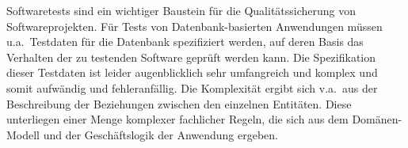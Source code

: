 
%
%
%
%



Softwaretests sind ein wichtiger Baustein für die Qualitätssicherung von Softwareprojekten. Für Tests von Datenbank-basierten Anwendungen müssen u.a.~Testdaten für die Datenbank spezifiziert werden, auf deren Basis das Verhalten der zu testenden Software 
geprüft werden kann.
%
%
Die Spezifikation dieser Testdaten ist leider augenblicklich sehr umfangreich und komplex und somit aufwändig und fehleranfällig.
%
%
Die Komplexität ergibt sich v.a.~aus der Beschreibung der Beziehungen zwischen den einzelnen Entitäten.
%
Diese unterliegen einer Menge komplexer fachlicher Regeln, die sich aus dem Domänen-Modell und der Geschäftslogik der Anwendung ergeben.
%


